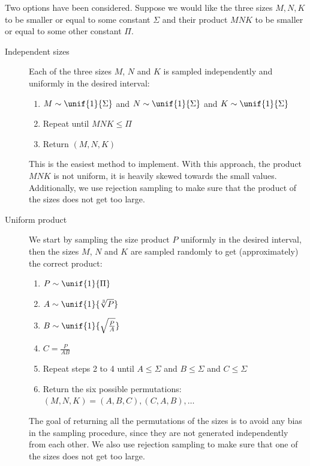             Two options have been considered. Suppose we would like the three sizes \(M,N,K\) to be smaller or equal to
            some constant \(\Sigma\) and their product \(MNK\) to be smaller or equal to some other constant \(\Pi\).
            \begin{description}
                \item[Independent sizes] Each of the three sizes \(M\), \(N\) and \(K\) is sampled independently and
                    uniformly in the desired interval:
                    \begin{enumerate}
                        \item \(M \sim \unif{1}{\Sigma}\) and \(N \sim \unif{1}{\Sigma}\) and
                            \(K \sim \unif{1}{\Sigma}\)
                        \item Repeat until \(MNK \leq \Pi\)
                        \item Return \((M,N,K)\)
                    \end{enumerate}
                    This is the easiest method to implement. With this approach, the product
                    \(MNK\) is not uniform, it is heavily skewed towards the small values. Additionally, we use rejection
                    sampling to make sure that the product of the sizes does not get too large.
                \item[Uniform product] We start by sampling the size product \(P\) uniformly in the desired interval,
                    then the sizes \(M\), \(N\) and \(K\) are sampled randomly to get (approximately) the correct
                    product:
                    \begin{enumerate}
                        \item \(P \sim \unif{1}{\Pi}\)
                        \item \(A \sim \unif{1}{\sqrt[3]{P}}\)
                        \item \(B \sim \unif{1}{\sqrt{\frac{P}{A}}}\)
                        \item \(C = \frac{P}{AB}\)
                        \item Repeat steps 2 to 4 until \(A \leq \Sigma\) and \(B \leq \Sigma\) and \(C \leq \Sigma\)
                        \item Return the six possible permutations: \((M,N,K) = (A,B,C), (C,A,B), \dots\)
                    \end{enumerate}
                    The goal of returning all the permutations of the sizes is to avoid any bias in the sampling
                    procedure, since they are not generated independently from each other. We also use rejection
                    sampling to make sure that one of the sizes does not get too large.
            \end{description}

